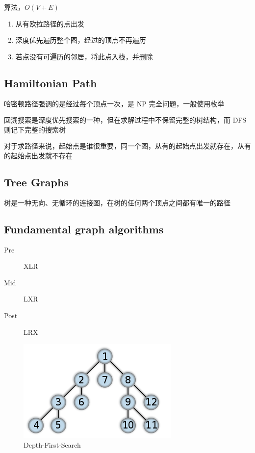 \documentclass[11pt,journal,compsoc]{IEEEtran}
\begin{document}
算法，$O(V + E)$

\begin{enumerate}
    \item 从有欧拉路径的点出发

    \item 深度优先遍历整个图，经过的顶点不再遍历

    \item 若点没有可遍历的邻居，将此点入栈，并删除
\end{enumerate}


\subsection{Hamiltonian Path}

哈密顿路径强调的是经过每个顶点一次，是 NP 完全问题，一般使用枚举

回溯搜索是深度优先搜索的一种，但在求解过程中不保留完整的树结构，而 DFS 则记下完整的搜索树

对于求路径来说，起始点是谁很重要，同一个图，从有的起始点出发就存在，从有的起始点出发就不存在


\subsection{Tree Graphs}

树是一种无向、无循环的连接图，在树的任何两个顶点之间都有唯一的路径


\subsection{Fundamental graph algorithms}

\begin{description}
    \item[Pre] XLR
    \item[Mid] LXR
    \item[Post] LRX
\end{description} 

\begin{figure}
    \centering
    \includegraphics[width=\linewidth]{DFS.png}
    \caption{Depth-First-Search}
\end{figure}
\end{document}
